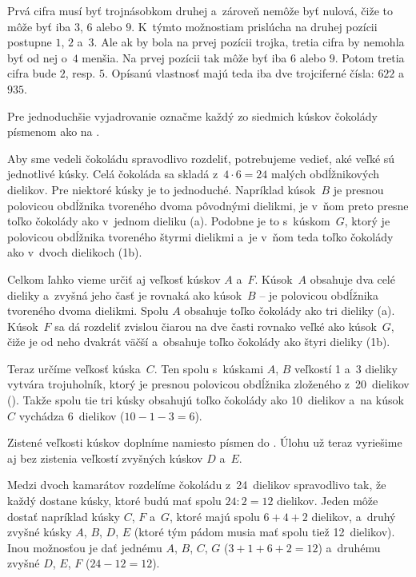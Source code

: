 {%
Prvá cifra musí byť trojnásobkom druhej a~zároveň nemôže byť nulová, čiže to môže byť iba $3$, $6$ alebo $9$. K~týmto možnostiam prislúcha na druhej pozícii postupne $1$, $2$ a~$3$. Ale ak by bola na prvej pozícii trojka, tretia cifra by nemohla byť od nej o~$4$ menšia. Na prvej pozícii tak môže byť iba $6$ alebo $9$. Potom tretia cifra bude $2$, resp. $5$. Opísanú vlastnosť majú teda iba dve trojciferné čísla: $622$ a~$935$.}

{%
Pre jednoduchšie vyjadrovanie označme každý zo siedmich kúskov čokolády písmenom ako na \obr.
%

Aby sme vedeli čokoládu spravodlivo rozdeliť, potrebujeme vedieť, aké veľké sú jednotlivé kúsky. Celá čokoláda sa skladá z~$4\cdot6=24$ malých obdĺžnikových dielikov. Pre niektoré kúsky je to jednoduché. Napríklad kúsok~$B$ je presnou polovicou obdĺžnika tvoreného dvoma pôvodnými dielikmi, je v~ňom preto presne toľko čokolády ako v~jednom dieliku (\obr{}a).
%
Podobne je to s~kúskom~$G$, ktorý je polovicou obdĺžnika tvoreného štyrmi dielikmi a~je v~ňom teda toľko čokolády ako v~dvoch dielikoch (\obrr1b).

Celkom ľahko vieme určiť aj veľkosť kúskov $A$ a~$F$. Kúsok~$A$ obsahuje dva celé dieliky a~zvyšná jeho časť je rovnaká ako kúsok~$B$ -- je polovicou obdĺžnika tvoreného dvoma dielikmi. Spolu $A$ obsahuje toľko čokolády ako tri dieliky (\obr{}a).
%
Kúsok~$F$ sa dá rozdeliť zvislou čiarou na dve časti rovnako veľké ako kúsok~$G$, čiže je od neho dvakrát väčší a~obsahuje toľko čokolády ako štyri dieliky (\obrr1b).

Teraz určíme veľkosť kúska~$C$. Ten spolu s~kúskami $A$, $B$ veľkostí 1 a~3 dieliky vytvára trojuholník, ktorý je presnou polovicou obdĺžnika zloženého z~20~dielikov (\obr). Takže spolu tie tri kúsky obsahujú toľko čokolády ako 10~dielikov a~na kúsok~$C$ vychádza 6~dielikov (${10-1-3=6}$).
%

Zistené veľkosti kúskov doplníme namiesto písmen do \obr.
Úlohu už teraz vyriešime aj bez zistenia veľkostí zvyšných kúskov $D$ a~$E$.
%

Medzi dvoch kamarátov rozdelíme čokoládu z~24~dielikov spravodlivo tak, že každý dostane kúsky, ktoré budú mať spolu $24:2=12$ dielikov. Jeden môže dostať napríklad kúsky $C$, $F$ a~$G$, ktoré majú spolu $6+4+2$ dielikov, a~druhý zvyšné kúsky $A$, $B$, $D$, $E$ (ktoré tým pádom musia mať spolu tiež 12~dielikov). Inou možnosťou je dať jednému $A$, $B$, $C$, $G$ ($3+1+6+2=12$) a~druhému zvyšné $D$, $E$, $F$ ($24-12=12$).

}
